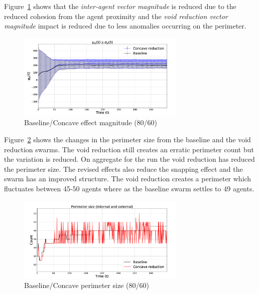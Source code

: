 \documentclass[preprint,12pt]{elsarticle}
\begin{document}
Figure~\ref{concave:BaselineConcaveEffectMag8060} shows that the \textit{inter-agent vector magnitude} is reduced due to the reduced cohesion from the agent proximity and the \textit{void reduction vector magnitude} impact is reduced due to less anomalies occurring on the perimeter.
\begin{figure}
\begin{center}
\includegraphics[width=8cm]{figures/BaselineConcaveEffectMag8060}
\end{center}
\caption{Baseline/Concave effect magnitude (80/60)\label{concave:BaselineConcaveEffectMag8060}}
\end{figure}

Figure~\ref{concave:BaselineConcavePerimeter8060} shows the changes in the perimeter size from the baseline and the void reduction swarms. The void reduction still creates an erratic perimeter count but the variation is reduced. On aggregate for the run the void reduction has reduced the perimeter size. The revised effects also reduce the snapping effect and the swarm has an improved structure. The void reduction creates a perimeter which fluctuates between 45-50 agents where as the baseline swarm settles to 49 agents.
\begin{figure}
\begin{center}
\includegraphics[width=8cm]{figures/BaselineConcavePerimeter8060}
\end{center}
\caption{Baseline/Concave perimeter size (80/60)\label{concave:BaselineConcavePerimeter8060}}
\end{figure}
\end{document}

